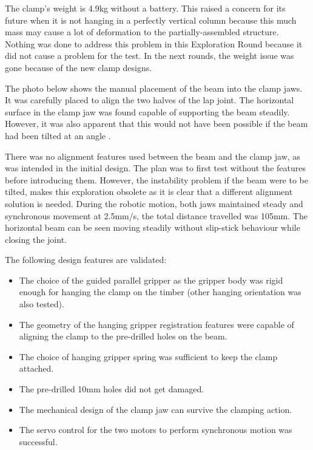 The clamp’s weight is 4.9kg without a battery. This raised a concern for its future when it is not hanging in a perfectly vertical column because this much mass may cause a lot of deformation to the partially-assembled structure. Nothing was done to address this problem in this Exploration Round because it did not cause a problem for the test. In the next rounds, the weight issue was gone because of the new clamp designs. 

The photo below shows the manual placement of the beam into the clamp jaws. It was carefully placed to align the two halves of the lap joint. The horizontal surface in the clamp jaw was found capable of supporting the beam steadily. However, it was also apparent that this would not have been possible if the beam had been tilted at an angle .

There was no alignment features used between the beam and the clamp jaw, as was intended in the initial design. The plan was to first test without the features before introducing them. However, the instability problem if the beam were to be tilted, makes this exploration obsolete as it is clear that a different alignment solution is needed.
During the robotic motion, both jaws maintained steady and synchronous movement at 2.5mm/s, the total distance travelled was 105mm. The horizontal beam can be seen moving steadily without slip-stick behaviour while closing the joint.  

The following design features are validated:
\begin{itemize}
    \item The choice of the guided parallel gripper as the gripper body was rigid enough for hanging the clamp on the timber (other hanging orientation was also tested).
    \item The geometry of the hanging gripper registration features were capable of aligning the clamp to the pre-drilled holes on the beam.
    \item The choice of hanging gripper spring was sufficient to keep the clamp attached.
    \item The pre-drilled 10mm holes did not get damaged.
    \item The mechanical design of the clamp jaw can survive the clamping action.
    \item The servo control for the two motors to perform synchronous motion was successful.
\end{itemize}

